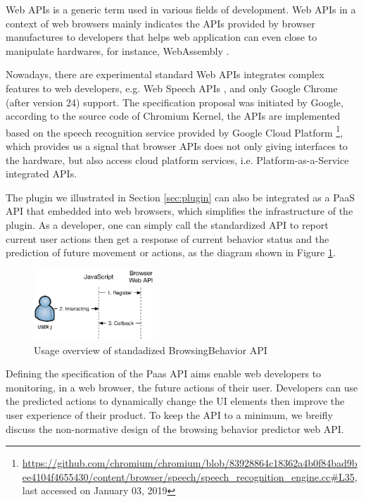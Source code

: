Web APIs is a generic term used in various fields of development.
Web APIs in a context of web browsers mainly indicates the APIs provided
by browser manufactures to developers that helps web application can even close
to manipulate hardwares, for instance, WebAssembly \cite{w3c2018ws}.

Nowadays, there are experimental standard Web APIs integrates complex features to 
web developers, e.g. Web Speech APIs \cite{mozilla2019speech}, and 
only Google Chrome (after version 24) support. 
The specification proposal was initiated by Google, according to 
the source code of Chromium Kernel, the APIs are implemented based on 
the speech recognition service provided 
by Google Cloud Platform 
\footnote{\url{https://github.com/chromium/chromium/blob/83928864c18362a4b0f84bad9bee4104f4655430/content/browser/speech/speech\_recognition\_engine.cc\#L35}, last accessed on January 03, 2019},
which provides us a signal that browser APIs does not only giving interfaces to
the hardware, but also access cloud platform services, i.e. Platform-as-a-Service integrated 
APIs.

The plugin we illustrated in Section \ref{sec:plugin} can also be integrated as a PaaS API
that embedded into web browsers, which simplifies the infrastructure of the plugin. 
As a developer, one can simply call the standardized API to report current user actions
then get a response of current behavior status and the prediction of future movement or 
actions, as the diagram shown in Figure \ref{fig:webapi}.

\begin{figure}[H]
    \centering
    \includegraphics[width=0.4\textwidth]{figures/webapi}
    \caption{Usage overview of standadized BrowsingBehavior API}
    \label{fig:webapi}
\end{figure}

Defining the specification of the Paas API aims enable web developers to
monitoring, in a web browser, the future actions of their user.
Developers can use the predicted actions to dynamically change the UI elements then improve
the user experience of their product. To keep the API to a minimum, we breifly discuss the
non-normative design of the browsing behavior predictor web API.

